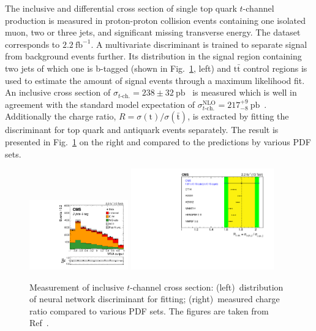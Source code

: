 \documentclass[12pt]{article}
\begin{document}
The inclusive and differential cross section of single top quark $t$-channel production is measured in proton-proton collision events containing one isolated muon, two or three jets, and significant missing transverse energy. The dataset corresponds to $2.2~\mathrm{fb}^{-1}$. A multivariate discriminant is trained to separate signal from background events further. Its distribution in the signal region containing two jets of which one is b-tagged (shown in Fig.~\ref{fig:t-channel}, left) and $\mathrm{t}\bar{\mathrm{t}}$ control regions is used to estimate the amount of signal events through a maximum likelihood fit. An inclusive cross section of $\sigma_{t\mathrm{\mbox{-}ch.}}=238\pm32~\mathrm{pb}$~\cite{tchannel-inc} is measured which is well in agreement with the standard model expectation of $\sigma_{t\mathrm{\mbox{-}ch.}}^\mathrm{NLO}=217^{+9}_{-8}~\mathrm{pb}$~\cite{hathor}. Additionally the charge ratio, $R=\sigma(\mathrm{t})/\sigma(\bar{\mathrm{t}})$, is extracted by fitting the discriminant for top quark and antiquark events separately. The result is presented in Fig.~\ref{fig:t-channel} on the right and compared to the predictions by various PDF sets.

\begin{figure}[!htb]
\begin{center}
\includegraphics[width=0.38\textwidth]{tch-nn.pdf}\hspace{0.02\textwidth}
\includegraphics[width=0.55\textwidth]{tch-ratio.pdf}
\caption{\label{fig:t-channel}Measurement of inclusive $t$-channel cross section: (left)~distribution of neural network discriminant for fitting; (right)~measured charge ratio compared to various PDF sets. The figures are taken from Ref~\cite{tchannel-inc}.}
\end{center}
\end{figure}
\end{document}
